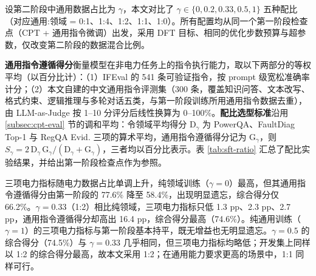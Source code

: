 \documentclass[fontset=fandol,type=master,campus=shenzhen,etitleauto=true]{hithesisbook}
\begin{document}
设第二阶段中通用数据占比为 $\gamma$，本文对比了 $\gamma \in \{0, 0.2, 0.33, 0.5, 1\}$ 五种配比（对应通用:领域 = 0:1、1:4、1:2、1:1、1:0）。所有配置均从同一个第一阶段检查点（CPT + 通用指令微调）出发，采用 DFT 目标、相同的优化步数预算与超参数，仅改变第二阶段的数据混合比例。

\textbf{通用指令遵循得分}衡量模型在非电力任务上的指令执行能力，取以下两部分的等权平均（以百分比计）：（1）IFEval\cite{ref85} 的 541 条可验证指令，按 prompt 级宽松准确率计分；（2）本文自建的中文通用指令评测集（300 条，覆盖知识问答、文本改写、格式约束、逻辑推理与多轮对话五类，与第一阶段训练所用通用指令数据去重），由 LLM-as-Judge 按 1--10 分评分后线性换算为 0--100\%。\textbf{配比选型标准}沿用 \ref{subsec:cpt-eval} 节的调和平均：令领域平均得分 $\text{D}_\gamma$ 为 PowerQA、FaultDiag Top-1 与 RegQA Evid. 三项的算术平均，通用指令遵循得分记为 $\text{G}_\gamma$，则 $S_\gamma = 2\,\text{D}_\gamma\,\text{G}_\gamma / (\text{D}_\gamma + \text{G}_\gamma)$，三者均以百分比表示。表 \ref{tab:sft-ratio} 汇总了配比实验结果，并给出第一阶段检查点作为参照。

\begin{table}[htbp]
\centering
\caption{SFT 第二阶段通用-领域数据配比实验结果}
\label{tab:sft-ratio}
\small
\setlength{\tabcolsep}{4pt}
\end{table}

三项电力指标随电力数据占比单调上升，纯领域训练（$\gamma = 0$）最高，但其通用指令遵循得分由第一阶段的 77.6\% 降至 58.4\%，出现明显遗忘，综合得分仅 66.2\%。$\gamma = 0.33$（1:2）相比纯领域，三项电力指标只低 1.3 pp、2.3 pp、2.7 pp，通用指令遵循得分却高出 16.4 pp，综合得分最高（74.6\%）。纯通用训练（$\gamma = 1$）的三项电力指标与第一阶段基本持平，既无增益也无明显遗忘。$\gamma = 0.5$ 的综合得分（74.5\%）与 $\gamma = 0.33$ 几乎相同，但三项电力指标均略低；开发集上同样以 1:2 的综合得分最高，故本文采用 1:2；在通用能力要求更高的场景中，1:1 同样可行。
\end{document}
